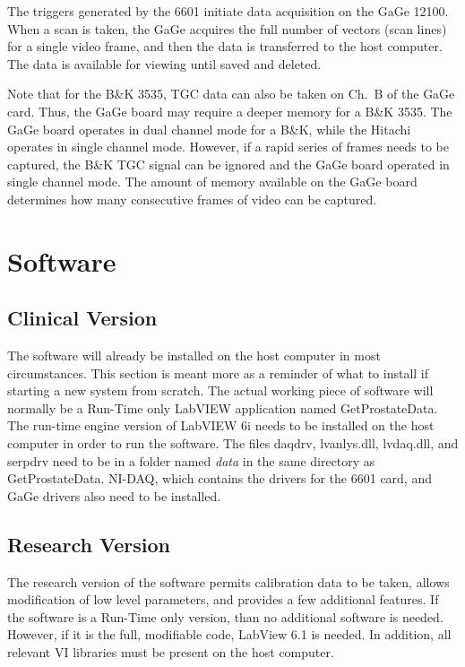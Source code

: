 \documentclass[10pt]{article}
\begin{document}
The triggers generated by the 6601 initiate data acquisition on
the GaGe 12100. When a scan is taken, the GaGe acquires the full
number of vectors (scan lines) for a single video frame, and then
the data is transferred to the host computer. The data is
available for viewing until saved and deleted.

Note that for the B\&K 3535, TGC data can also be taken on Ch.~B
of the GaGe card. Thus, the GaGe board may require a deeper memory
for a B\&K 3535. The GaGe board operates in dual channel mode for
a B\&K, while the Hitachi operates in single channel mode.
However, if a rapid series of frames needs to be captured, the
B\&K TGC signal can be ignored and the GaGe board operated in
single channel mode. The amount of memory available on the GaGe
board determines how many consecutive frames of video can be
captured.

\section{Software}

\subsection{Clinical Version} The software will already be
installed on the host computer in most circumstances. This section
is meant more as a reminder of what to install if starting a new
system from scratch. The actual working piece of software will
normally be a Run-Time only LabVIEW application named
GetProstateData. The run-time engine version of LabVIEW 6i needs
to be installed on the host computer in order to run the software.
The files daqdrv, lvanlys.dll, lvdaq.dll, and serpdrv need to be
in a folder named {\it data} in the same directory as
GetProstateData. NI-DAQ, which contains the drivers for the 6601
card, and GaGe drivers also need to be installed.

\subsection{Research Version}

The research version of the software permits calibration data to
be taken, allows modification of low level parameters, and
provides a few additional features. If the software is a Run-Time
only version, than no additional software is needed. However, if
it is the full, modifiable code, LabView 6.1 is needed. In
addition, all relevant VI libraries must be present on the host
computer.
\end{document}

